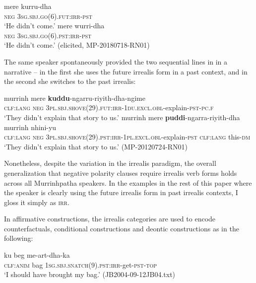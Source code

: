 \documentclass[output=paper,colorlinks,citecolor=brown]{langscibook}
\begin{document}
\ea\label{ex:mur:13} 
    \ea\label{ex:mur:13a}
        \gll mere kurru-dha\\
             \textsc{neg} \textsc{3sg.sbj.go(6).fut:irr-pst} \\
        \glt ‘He didn’t come.’
    \ex\label{ex:mur:13b}
        \gll mere wurri-dha\\
              \textsc{neg} \textsc{3sg.sbj.go(6).pst:irr-pst} \\
        \glt ‘He didn’t come.’ (elicited, MP-20180718-RN01)
    \z
\z 

The same speaker spontaneously provided the two sequential lines in  in a narrative – in the first she uses the future irrealis form in a past context, and in the second she switches to the past irrealis:

\ea\label{ex:mur:14} 
    \ea\label{ex:mur:14a}
        \gll murrinh mere \textbf{kuddu}{}-ngarru-riyith-dha-ngime  \\ 
             \textsc{clf:lang} \textsc{neg} \textsc{3pl.sbj.shove(29).fut:irr}-\textsc{1du.excl.obl-}explain\textsc{{}-pst-pc.f}  \\
        \glt ‘They didn't explain that story to us.’
    \ex\label{ex:mur:14b}
        \gll murrinh mere \textbf{puddi}{}-ngarra-riyith-dha  murrinh nhini-yu \\
              \textsc{clf:lang} \textsc{neg} \textsc{3pl.sbj.shove(29).pst:irr}-\textsc{1pl.excl.obl-}explain\textsc{{}-pst} \textsc{clf:lang} this-\textsc{dm} \\
        \glt ‘They didn't explain that story to us.’ (MP-20120724-RN01)
    \z
\z 

Nonetheless, despite the variation in the irrealis paradigm, the overall generalization that negative polarity clauses require irrealis verb forms holds across all Murrinhpatha speakers. In the examples in the rest of this paper where the speaker is clearly using the future irrealis form in past irrealis contexts, I gloss it simply as \textsc{irr.}

In affirmative constructions, the irrealis categories are used to encode counterfactuals, conditional constructions and deontic constructions as in the following:

\ea\label{ex:mur:15}
    \gll ku beg me-art-dha-ka\\
         \textsc{clf:anim} bag \textsc{1sg.sbj.snatch(9).pst:irr}{}-get-\textsc{pst-top}\\
    \glt ‘I should have brought my bag.’ (JB2004-09-12JB04.txt)
\z 
\end{document}
